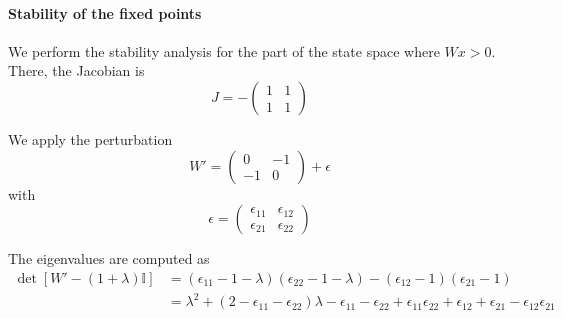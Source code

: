 \documentclass{article} %
\newcounter{ct}
\newcommand{\win}{\vW_{\text{in}}}
\newcommand{\wout}{\vW_{\text{out}}}
\newcommand{\bout}{\vb_{\text{out}}}
\theoremstyle{definition}
\theoremstyle{remark}
\begin{document}



%



\paragraph{Stability of the fixed points}
We perform the stability analysis for the part of the state space where $Wx>0$.
There, the Jacobian is
\begin{equation}
J = -
\begin{pmatrix}
1  &  1 \\
1  &  1
\end{pmatrix}
\end{equation}

We apply the perturbation
\begin{equation}
W' = 
\begin{pmatrix}
0  &  -1 \\
-1  &  0
\end{pmatrix}
+ \epsilon
\end{equation}
with 
\begin{equation}
\epsilon = 
\begin{pmatrix}
\epsilon_{11}  &  \epsilon_{12} \\
\epsilon_{21}  &  \epsilon_{22}
\end{pmatrix}
\end{equation}

The eigenvalues are computed as
\begin{align*}
\det [W' -(1+\lambda)\mathbb{I}] &= (\epsilon_{11}-1-\lambda)(\epsilon_{22}-1-\lambda)-(\epsilon_{12}-1)(\epsilon_{21}-1)\\
&=\lambda^2 + (2-\epsilon_{11}-\epsilon_{22})\lambda -\epsilon_{11}-\epsilon_{22}+\epsilon_{11}\epsilon_{22} +\epsilon_{12} + \epsilon_{21} - \epsilon_{12}\epsilon_{21}
\end{align*}
\end{document}
